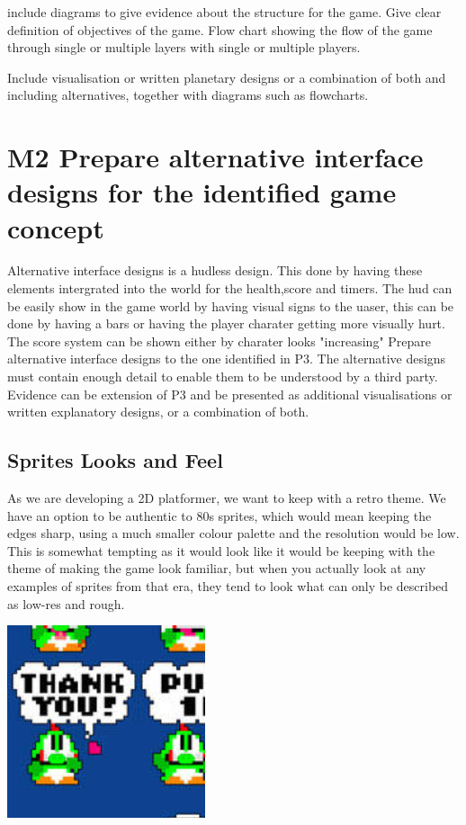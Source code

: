 \documentclass{article}
\begin{document}
include diagrams to give evidence about the structure for the game. Give clear definition of objectives of the game. Flow chart showing the flow of the game through single or multiple layers with single or multiple players.

Include visualisation or written planetary designs or a combination of both and including alternatives, together with diagrams such as flowcharts.






\section{M2 Prepare alternative interface designs for the identified game concept}
Alternative interface designs is a hudless design. This done by having these elements intergrated into the world for the health,score and timers. The hud can be easily show in the game world by having visual signs to the uaser, this can be done by having a bars or having the player charater getting more visually hurt. The score system can be shown either by charater looks "increasing"
Prepare alternative interface designs to the one identified in P3. The alternative designs must contain enough detail to enable them to be understood by a third party. Evidence can be extension of P3 and be presented as additional visualisations or written explanatory designs, or a combination of both.


\subsection{ Sprites Looks and Feel }
As we are developing a 2D platformer, we want to keep with a retro theme. We have an option to be authentic to 80s sprites, which would mean keeping the edges sharp, using a much smaller colour palette and the resolution would be low.
This is somewhat tempting as it would look like it would be keeping with the theme of making the game look familiar, but when you actually look at any examples of sprites from that era, they tend to look what can only be described as low-res and rough.

\includegraphics[scale=0.5]{TraditionalSprite}
\end{document}

